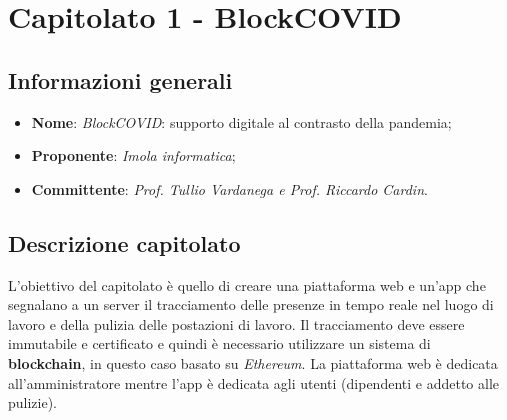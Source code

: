 \section{Capitolato 1 - BlockCOVID}
\subsection{Informazioni generali}
\begin{itemize}
    \item \textbf{Nome}: \emph{BlockCOVID}: supporto digitale al contrasto della pandemia;
    \item \textbf{Proponente}: \emph{Imola informatica};
    \item \textbf{Committente}: \emph{Prof. Tullio Vardanega e Prof. Riccardo Cardin}.
\end{itemize}
\subsection{Descrizione capitolato}
L'obiettivo del capitolato è quello di creare una piattaforma web e un'app che segnalano a un server il tracciamento delle presenze in tempo reale nel luogo di lavoro e della pulizia delle postazioni di lavoro. Il tracciamento deve essere immutabile e certificato e quindi è necessario utilizzare un sistema di \textbf{blockchain}, in questo caso basato su \emph{Ethereum}. La piattaforma web è dedicata all'amministratore mentre l'app è dedicata agli utenti (dipendenti e addetto alle pulizie).
